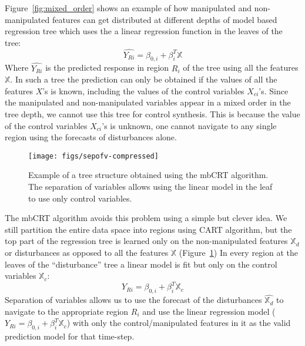 \documentclass{sig-alternate-ipsn13}
\theoremstyle{definition}
\begin{document}
Figure~\ref{fig:mixed_order} shows an example of how manipulated and non-manipulated features can get distributed at different depths of model based regression tree which uses the a linear regression function in the leaves of the tree:
\begin{equation}
\hat{Y_{Ri}} = \beta_{0,i} + \beta^T_i \mathbb{X}
\label{eq:linear_regression_leaf}
\end{equation}
Where $\hat{Y_{Ri}}$ is the predicted response in region $R_i$ of the tree using all the features $\mathbb{X}$. 
 In such a tree the prediction can only be obtained if the values of all the features $X$'s is known, including the values of the control variables $X_{ci}$'s. 
Since the manipulated and non-manipulated variables appear in a mixed order in the tree depth, we cannot use this tree for control synthesis.
This is because the value of the control variables $X_{ci}$'s is unknown, one cannot navigate to any single region using the forecasts of disturbances alone. 
\begin{figure}
  \centering
  \texttt{[image: figs/sepofv-compressed]}
  \caption{Example of a tree structure obtained using the mbCRT algorithm. The separation of variables allows using the linear model in the leaf to use only control variables.}
  \label{fig:algo1}
   \vspace{-5pt}
\end{figure}

The mbCRT algorithm avoids this problem using a simple but clever idea. We still partition the entire data space into regions using CART algorithm, but the top part of the regression tree is learned only on the non-manipulated features $\mathbb{X}_d$ or disturbances as opposed to all the features $\mathbb{X}$ (Figure~\ref{fig:algo1})
In every region at the leaves of the ``disturbance'' tree a linear model is fit but only on the control variables $\mathbb{X}_c$:
\begin{equation}
Y_{Ri} = \beta_{0,i} + \beta^T_i \mathbb{X}_c
\label{eq:control_leaf}
\end{equation}
Separation of variables allows us to use the forecast of the disturbances $\hat{\mathbb{X}_d}$ to navigate to the appropriate region $R_i$ and use the linear regression model ($Y_{Ri} = \beta_{0,i} + \beta^T_i \mathbb{X}_c$) with only the control/manipulated features in it as the valid prediction model for that time-step.
\end{document}
